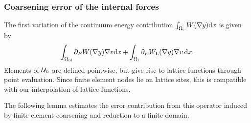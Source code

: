 %
%
%





\subsubsection{Coarsening error of the internal forces}
\label{sec: internal_forces_qnll_cg}
The first variation of the continuum energy contribution $\int_{\Omega_{{\rm c}}} W(\nabla y)\text{d}x$ is given by
\begin{equation*}
	\int_{\Omega_{{\rm nl}}} \partial_{F} W(\nabla y)\nabla v \text{d}x+\int_{\Omega_{{\rm l}}} \partial_{F} W_{\text{L}}(\nabla y)\nabla v \,\textrm{d}x.
\end{equation*}
Elements of $\mathcal{U}_{h}$ are defined pointwise, but give rise to lattice functions through point evaluation. Since finite element nodes lie on lattice sites, this is compatible with our interpolation of lattice functions.

The following lemma estimates the error contribution from this operator induced by finite element coarsening and reduction to a finite domain.

